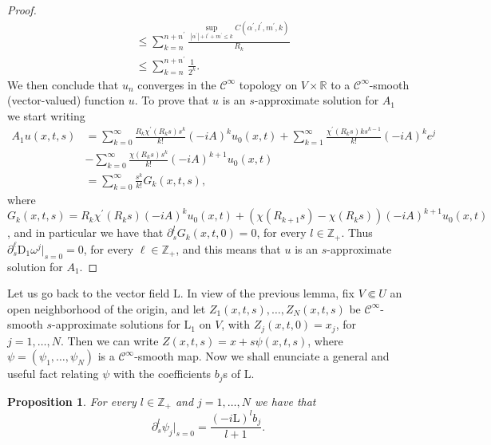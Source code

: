 \documentclass[11pt]{amsart}
\theoremstyle{definition}
\theoremstyle{remark}
\theoremstyle{plain}
\newtheorem{prop}[defn]{Proposition}
\begin{document}
\begin{proof}
\begin{align*}
	& \leq \sum_{k=n}^{n + n^\prime} \frac{\sup_{|\alpha^\prime|+l^\prime + m^\prime \leq k}C(\alpha^\prime, l^\prime, m^\prime, k)}{R_k}  \\
	& \leq \sum_{k=n}^{n + n^\prime} \frac{1}{2^k}.
\end{align*}	 
%
We then conclude that $u_n$ converges in the $\mathcal{C}^\infty$ topology on $V\times \mathbb{R}$ to a $\mathcal{C}^\infty$-smooth (vector-valued) function $u$. To prove that $u$ is an $s$-approximate solution for $A_1$ we start writing
%
\begin{align*}
	A_1 u(x,t,s) &= \sum_{k=0}^\infty \frac{ R_k \chi^\prime (R_k s)s^{k}}{k!}(-iA)^k u_0(x,t) + \sum_{k=1}^\infty \frac{\chi^\prime(R_k s)k s^{k-1}}{k!} (-iA)^k e^j \\
	& - \sum_{k=0}^\infty \frac{\chi(R_k s) s^k}{k!}(-iA)^{k+1} u_0(x,t) \\
	& = \sum_{k=0}^\infty \frac{s^k}{k!}G_k(x,t,s),
\end{align*}
%
where $G_k(x,t,s) = R_k \chi^\prime(R_k s)(-iA)^k u_0(x,t) + (\chi(R_{k+1} s) - \chi(R_k s))(-iA)^{k+1} u_0(x,t)$, and in particular we have that $\partial_s^l G_k(x,t,0) = 0$, for every $l \in \mathbb{Z}_+$. Thus $\partial_s^\ell \mathrm{D}_1 {\omega}^j\big|_{s=0} = 0$, for every $\ell \in \mathbb{Z}_+$, and this means that $u$ is an $s$-approximate solution for $A_1$.
 \end{proof}
%
Let us go back to the vector field $\mathrm{L}$. In view of the previous lemma, fix $V \Subset U$ an open neighborhood of the origin, and let $Z_1(x,t,s), \dots, Z_N(x,t,s)$ be $\mathcal{C}^\infty$-smooth $s$-approximate solutions for $\mathrm{L}_1$ on $V$, with $Z_j(x,t,0) = x_j$, for $j = 1, \dots, N$. Then we can write $Z(x,t,s) = x + s\psi(x,t,s)$, where $\psi = (\psi_1, \dots, \psi_N)$ is a $\mathcal{C}^\infty$-smooth map. Now we shall enunciate a general and useful fact relating $\psi$ with the coefficients $b_j$s of $\mathrm{L}$.
%
\begin{prop}
	For every $l \in \mathbb{Z}_+$ and $j = 1, \dots, N$ we have that 
	\begin{equation}\label{eq:relation_psi_b}
		\partial_s^l \psi_j|_{s=0} = \frac{(-i\mathrm{L})^l b_j}{l+1}.
	\end{equation}	
\end{prop}
%
\end{document}
